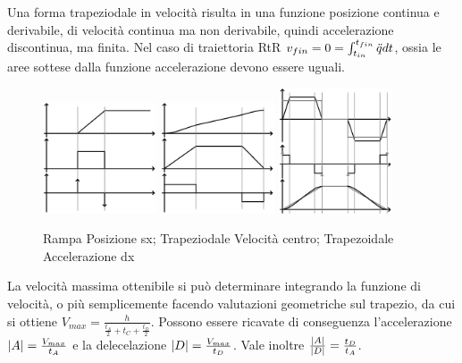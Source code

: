 Una forma trapeziodale in velocità risulta in una funzione posizione continua e derivabile, di velocità continua ma non derivabile, quindi accelerazione discontinua, ma finita.
Nel caso di traiettoria RtR \( v_{fin} = 0 = \int^{t_{fin}}_{t_{in}} \Ddot{q} dt \), ossia le aree sottese dalla funzione accelerazione devono essere uguali.

\begin{figure}[h]
    \centering
    \includegraphics[width=0.3\textwidth]{Immagini/rampa_pos.png}
    \includegraphics[width=0.3\textwidth]{Immagini/trapezoidale_vel.png}
    \includegraphics[width=0.3\textwidth]{Immagini/trapezoidale_acc.png}
    \caption{Rampa Posizione sx; Trapeziodale Velocità centro; Trapezoidale Accelerazione dx}
\end{figure}

La velocità massima ottenibile si può determinare integrando la funzione di velocità, o più semplicemente facendo valutazioni geometriche sul trapezio, da cui si ottiene \(V_{max} = \frac{h}{\frac{t_A}{2}+t_C +\frac{t_D}{2}}\).
Possono essere ricavate di conseguenza l'accelerazione \(\left|A\right| = \frac{V_{max}}{t_A}\) e la delecelazione \(\left|D\right| = \frac{V_{max}}{t_D}\). Vale inoltre \(\frac{\left|A\right|}{\left|D\right|} = \frac{t_D}{t_A}\).

